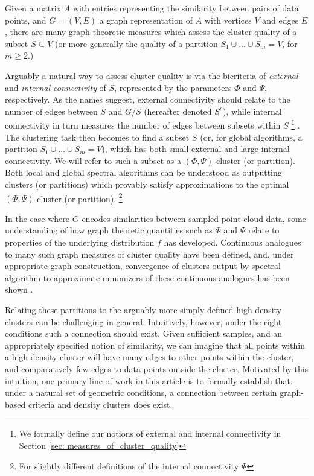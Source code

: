 \documentclass{article}
\theoremstyle{aldenthm}
\theoremstyle{remark}
\begin{document}
Given a matrix $A$ with entries representing the similarity between pairs of data points, and $G  = (V,E)$ a graph representation of $A$ with vertices $V$ and edges $E$, there are many \cite{yang2015,fortunato2010} graph-theoretic measures which assess the cluster quality of a subset $S \subseteq V$ (or more generally the quality of a partition $S_1 \cup \ldots \cup S_m = V$, for $m \geq 2$.)

Arguably a natural way to assess cluster quality is via the bicriteria of \textit{external} and \textit{internal connectivity} of $S$, represented by the parameters $\Phi$ and $\Psi$, respectively. As the names suggest, external connectivity should relate to the number of edges between $S$ and $G / S$ (hereafter denoted $S^c$), while internal connectivity in turn measures the number of edges between subsets within $S$ \footnote{We formally define our notions of external and internal connectivity in Section \ref{sec: measures_of_cluster_quality}} . The clustering task then becomes to find a subset $S$ (or, for global algorithms, a partition $S_1 \cup \ldots \cup S_m = V$), which has both small external and large internal connectivity. We will refer to such a subset as a $(\Phi,\Psi)$-cluster (or partition). Both local \cite{zhu2013} and global \cite{kannan04} spectral algorithms can be understood as outputting clusters (or partitions) which provably satisfy approximations to the optimal $(\Phi, \Psi)$-cluster (or partition). \footnote{For slightly different definitions of the internal connectivity $\Psi$}

In the case where $G$ encodes similarities between sampled point-cloud data, some understanding of how graph theoretic quantities such as $\Phi$ and $\Psi$ relate to properties of the underlying distribution $f$ has developed. Continuous analogues to many such graph measures of cluster quality have been defined, and, under appropriate graph construction, convergence of clusters output by spectral algorithm to approximate minimizers of these continuous analogues has been shown \cite{vonluxburg2008, garciatrillos18}.

Relating these partitions to the arguably more simply defined high density clusters can be challenging in general. Intuitively, however, under the right conditions such a connection should exist. Given sufficient samples, and an appropriately specified notion of similarity, we can imagine that all points within a high density cluster will have many edges to other points within the cluster, and comparatively few edges to data points outside the cluster. Motivated by this intuition, one primary line of work in this article is to formally establish that, under a natural set of geometric conditions, a connection between certain graph-based criteria and density clusters does exist.
\end{document}
